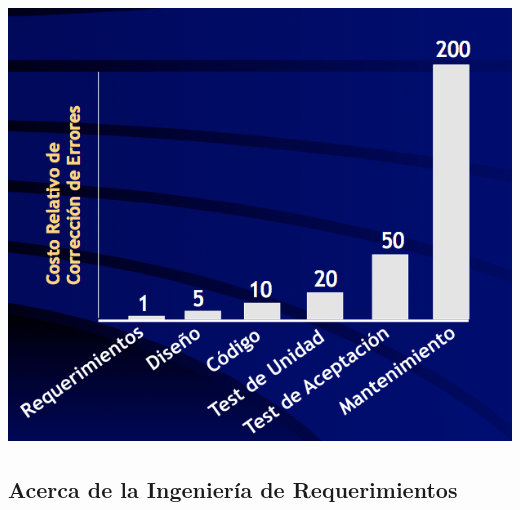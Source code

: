 \documentclass[]{article}
\begin{document}
\begin{center}
	\includegraphics[scale=0.50]{Detec.png}
\end{center}

\subsection{Acerca de la Ingeniería de Requerimientos}
\end{document}
